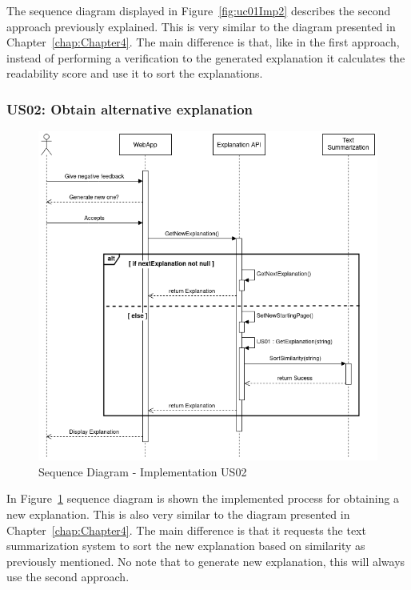 The sequence diagram displayed in Figure~\ref{fig:uc01Imp2} describes the second approach previously explained.
This is very similar to the diagram presented in Chapter~\ref{chap:Chapter4}.
The main difference is that, like in the first approach, instead of performing a verification to the generated explanation it calculates the readability score and use it to sort the explanations.

\subsubsection{US02: Obtain alternative explanation}

\begin{figure}[H]
\centering
\includegraphics[scale=0.45]{ch5/assets/US02_SD_Implement.png}
\caption[Sequence Diagram Implementation US02]{Sequence Diagram - Implementation US02}
\label{fig:uc02Imp}
\end{figure}

In Figure~\ref{fig:uc02Imp} sequence diagram is shown the implemented process for obtaining a new explanation.
This is also very similar to the diagram presented in Chapter~\ref{chap:Chapter4}.
The main difference is that it requests the text summarization system to sort the new explanation based on similarity as previously mentioned.
No note that to generate new explanation, this will always use the second approach.


